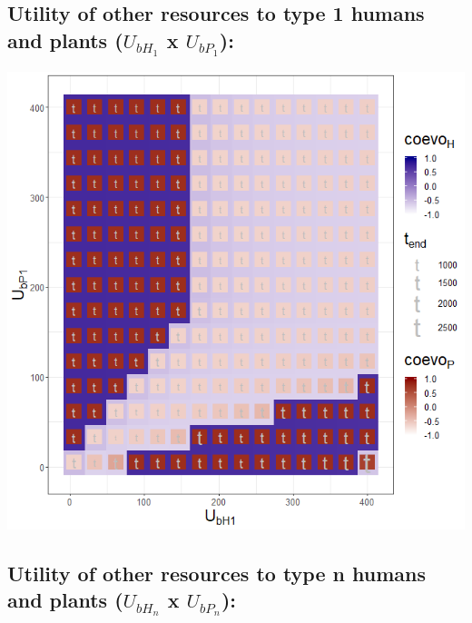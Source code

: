\documentclass[]{book}
\begin{document}
\newpage

\hypertarget{utility-of-other-resources-to-type-1-humans-and-plants-u_bh_1-x-u_bp_1}{%
\subsection{\texorpdfstring{Utility of other resources to type 1 humans and plants (\(U_{bH_{1}}\) x \(U_{bP_{1}}\)):}{Utility of other resources to type 1 humans and plants (U\_\{bH\_\{1\}\} x U\_\{bP\_\{1\}\}):}}\label{utility-of-other-resources-to-type-1-humans-and-plants-u_bh_1-x-u_bp_1}}

\includegraphics[width=1\linewidth]{plots/3_twoPar-U.bH1-U.bP1_plot}

\newpage

\hypertarget{utility-of-other-resources-to-type-n-humans-and-plants-u_bh_n-x-u_bp_n}{%
\subsection{\texorpdfstring{Utility of other resources to type n humans and plants (\(U_{bH_{n}}\) x \(U_{bP_{n}}\)):}{Utility of other resources to type n humans and plants (U\_\{bH\_\{n\}\} x U\_\{bP\_\{n\}\}):}}\label{utility-of-other-resources-to-type-n-humans-and-plants-u_bh_n-x-u_bp_n}}
\end{document}

